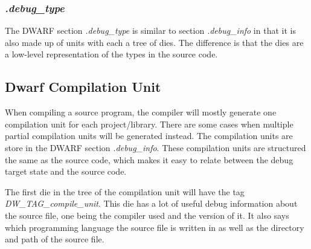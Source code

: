 \subsubsection{\emph{.debug\_type}}
The \gls{DWARF} section \emph{.debug\_type} is similar to section \emph{.debug\_info} in that it is also made up of units with each a tree of \glspl{die}.
The difference is that the \glspl{die} are a low-level representation of the types in the source code.



\subsection{Dwarf Compilation Unit}
 


When compiling a source program, the compiler will mostly generate one compilation unit for each project/library.
There are some cases when multiple partial compilation units will be generated instead.
The compilation units are store in the \gls{DWARF} section \emph{.debug\_info}.
These compilation units are structured the same as the source code, which makes it easy to relate between the debug target state and the source code.


The first \gls{die} in the tree of the compilation unit will have the tag \emph{DW\_TAG\_compile\_unit}.
This \gls{die} has a lot of useful debug information about the source file, one being the compiler used and the version of it.
It also says which programming language the source file is written in as well as the directory and path of the source file.


